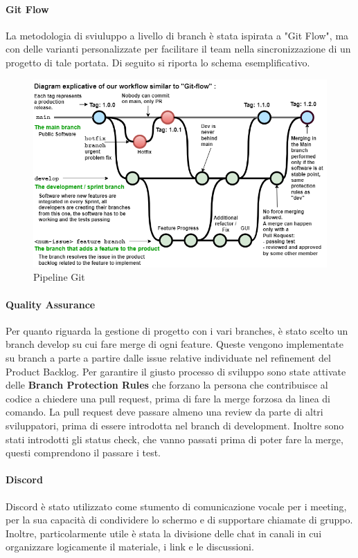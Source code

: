     \paragraph{Git Flow}
    La metodologia di sviuluppo a livello di branch è stata ispirata a "Git Flow", ma con delle varianti personalizzate per facilitare il team nella sincronizzazione di un progetto di tale portata. Di seguito si riporta lo schema esemplificativo.
    \begin{figure}[H]
        \caption{Pipeline Git}
        \label{fig:pipeline-git}
        \centering
        \includegraphics[width=1\textwidth]{Images/pipeline-git.png}
    \end{figure}

    \paragraph{Quality Assurance}
    Per quanto riguarda la gestione di progetto con i vari branches, è stato scelto un branch develop su cui fare merge di ogni feature. Queste vengono implementate su branch a parte a partire dalle issue relative individuate nel refinement del Product Backlog. 
    Per garantire il giusto processo di sviluppo sono state attivate delle \textbf{Branch Protection Rules} che forzano la persona che contribuisce al codice a chiedere una pull request, prima di fare la merge forzosa da linea di comando. La pull request deve passare almeno una review da parte di altri sviluppatori, prima di essere introdotta nel branch di development. Inoltre sono stati introdotti gli status check, che vanno passati prima di poter fare la merge, questi comprendono il passare i test. 

    \paragraph{Discord}
    Discord è stato utilizzato come stumento di comunicazione vocale per i meeting, per la sua capacità di condividere lo schermo e di supportare chiamate di gruppo. Inoltre, particolarmente utile è stata la divisione delle chat in canali in cui organizzare logicamente il materiale, i link e le discussioni.
    
